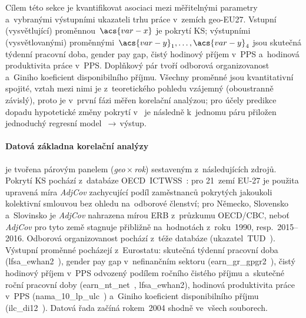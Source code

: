 
Cílem této sekce je kvantifikovat asociaci mezi měřitelnými parametry
 a~vybranými výstupními ukazateli trhu práce v~zemích \acs{geo-EU27}.
Vstupní (vysvětlující) proměnnou~$\acs{var-x}$ je pokrytí \acs{KS}; výstupními (vysvětlovanými)
proměnnými~$\acs{var-y}_1,\ldots,\acs{var-y}_4$ jsou skutečná týdenní pracovní doba, gender pay
gap, čistý hodinový příjem v~\acs{PPS} a~hodinová produktivita práce v~\acs{PPS}.
Doplňkový pár tvoří odborová organizovanost a~Giniho koeficient disponibilního příjmu.
Všechny proměnné jsou kvantitativní spojité, vztah mezi nimi je z~teoretického
pohledu vzájemný (oboustranně závislý), proto je v~první fázi měřen
korelační analýzou; pro účely predikce dopadu hypotetické změny pokrytí v~
je následně k~jednomu páru přiložen jednoduchý regresní model
\,$\to$\,výstup.

\paragraph{Datová základna korelační analýzy}\label{par:korelace_data} je tvořena párovým panelem (\textit{geo\,$\times$\,rok})
sestaveným z~následujících zdrojů. Pokrytí \acs{KS} pochází z~databáze \acs{OECD}~\acs{ICTWSS}~\cite{oecd_aias_ictwss_CBC_ERB_pct}:
pro 21~zemí EU-27 je použita upravená míra \textit{AdjCov} zachycující podíl
zaměstnanců pokrytých jakoukoli kolektivní smlouvou bez ohledu na~odborové
členství; pro Německo, Slovensko a~Slovinsko je \textit{AdjCov} nahrazena
mírou ERB z~průzkumu \acs{OECD}/CBC, neboť \textit{AdjCov} pro tyto země
stagnuje přibližně na~hodnotách z~roku~1990, resp.\ 2015--2016. Odborová organizovanost
pochází z~téže databáze (ukazatel~TUD~\cite{oecd_aias_ictwss_TUD_pct}).
Výstupní proměnné pocházejí z~Eurostatu: skutečná týdenní pracovní doba
(lfsa\_ewhan2~\cite{eurostat_lfsa_ewhan2_HR_weekly}), gender pay gap
v~nefinančním sektoru (earn\_gr\_gpgr2~\cite{eurostat_gpg}), čistý hodinový
příjem v~\acs{PPS} odvozený podílem ročního čistého příjmu a~skutečné roční
pracovní doby (earn\_nt\_net~\cite{eurostat_earn_nt_net_PPS_AW100},
lfsa\_ewhan2), hodinová produktivita práce v~\acs{PPS}
(nama\_10\_lp\_ulc~\cite{eurostat_nama_10_lp_ulc_NLPR_HW_EU27eq100})
a~Giniho koeficient disponibilního příjmu (ilc\_di12~\cite{eurostat_ilc_di12_Gini}).
Datová řada začíná rokem~2004 shodně ve~všech souborech.

